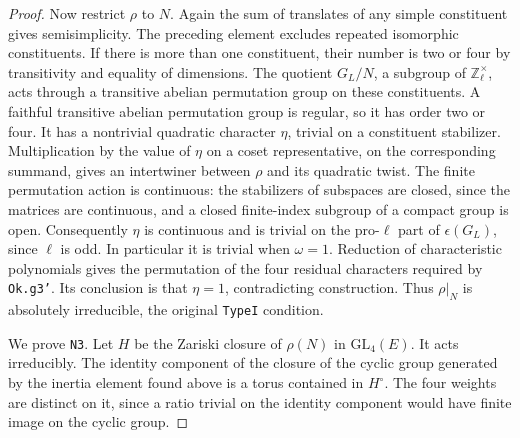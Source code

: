 \begin{proof}
Now restrict $\rho$ to $N$. Again the sum of translates
of any simple constituent gives semisimplicity. The
preceding element excludes repeated isomorphic
constituents. If there is more than one constituent, their
number is two or four by transitivity and equality of
dimensions. The quotient $G_L/N$, a subgroup of
$\mathbb Z_\ell^\times$, acts through a transitive
abelian permutation group on these constituents.
A faithful transitive abelian permutation group is
regular, so it has order two or four. It has a nontrivial
quadratic character $\eta$, trivial on a constituent
stabilizer. Multiplication by the value of $\eta$ on a
coset representative, on the corresponding summand,
gives an intertwiner between $\rho$ and its quadratic
twist. The finite permutation action is continuous:
the stabilizers of subspaces are closed, since the
matrices are continuous, and a closed finite-index
subgroup of a compact group is open. Consequently
$\eta$ is continuous and is trivial on the pro-$\ell$
part of $\epsilon(G_L)$, since $\ell$ is odd. In
particular it is trivial when $\omega=1$.
Reduction of characteristic polynomials gives the
permutation of the four residual characters required
by \texttt{Ok.g3'}. Its conclusion is that $\eta=1$,
contradicting construction. Thus $\rho|_N$ is
absolutely irreducible, the original \texttt{TypeI}
condition.

We prove \texttt{N3}. Let $H$ be the Zariski closure of
$\rho(N)$ in $\mathrm{GL}_4(E)$. It acts irreducibly.
The identity component of the closure of the cyclic
group generated by the inertia element found above
is a torus contained in $H^\circ$. The four weights
are distinct on it, since a ratio trivial on the identity
component would have finite image on the cyclic group.


\end{proof}
